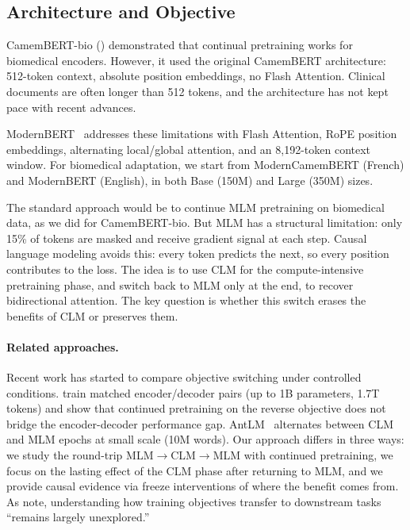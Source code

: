 \subsection{Architecture and Objective}

\begin{reviewread}
CamemBERT-bio () demonstrated that continual pretraining works for biomedical encoders. However, it used the original CamemBERT architecture: 512-token context, absolute position embeddings, no Flash Attention. Clinical documents are often longer than 512 tokens, and the architecture has not kept pace with recent advances.
\end{reviewread}

\begin{reviewread}
ModernBERT~\citep{modernbert} addresses these limitations with Flash Attention, RoPE position embeddings, alternating local/global attention, and an 8,192-token context window. For biomedical adaptation, we start from ModernCamemBERT (French) and ModernBERT (English), in both Base (150M) and Large (350M) sizes.
\end{reviewread}

\begin{reviewread}
The standard approach would be to continue MLM pretraining on biomedical data, as we did for CamemBERT-bio. But MLM has a structural limitation: only 15\% of tokens are masked and receive gradient signal at each step. Causal language modeling avoids this: every token predicts the next, so every position contributes to the loss. The idea is to use CLM for the compute-intensive pretraining phase, and switch back to MLM only at the end, to recover bidirectional attention. The key question is whether this switch erases the benefits of CLM or preserves them.
\end{reviewread}

\paragraph{Related approaches.} Recent work has started to compare objective switching under controlled conditions. \citet{ettin2025} train matched encoder/decoder pairs (up to 1B parameters, 1.7T tokens) and show that continued pretraining on the reverse objective does not bridge the encoder-decoder performance gap. AntLM~\citep{antlm2024} alternates between CLM and MLM epochs at small scale (10M words). Our approach differs in three ways: we study the round-trip MLM$\to$CLM$\to$MLM with continued pretraining, we focus on the lasting effect of the CLM phase after returning to MLM, and we provide causal evidence via freeze interventions of where the benefit comes from. As \citet{gisserot2025clm} note, understanding how training objectives transfer to downstream tasks ``remains largely unexplored.''



